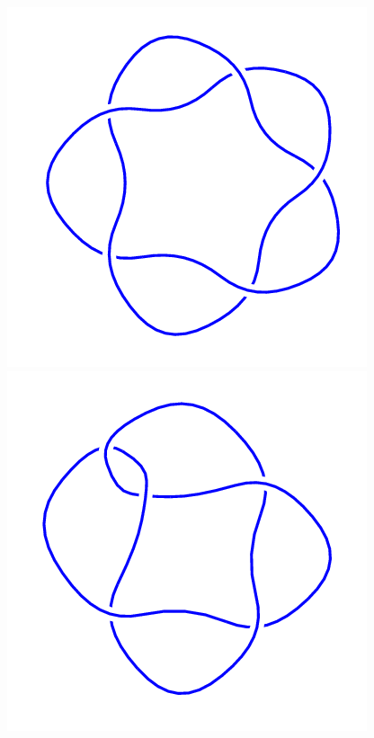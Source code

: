 \begin{figure}[H]
\begin{minipage}[b]{.18\linewidth}
	\end{minipage}
	\begin{minipage}[b]{.18\linewidth}
		\centering
		\includegraphics[width=\linewidth]{../data/5_1.png}
	\end{minipage}
	\begin{minipage}[b]{.18\linewidth}
		\centering
		\includegraphics[width=\linewidth]{../data/5_2.png}

\end{minipage}
\end{figure}
